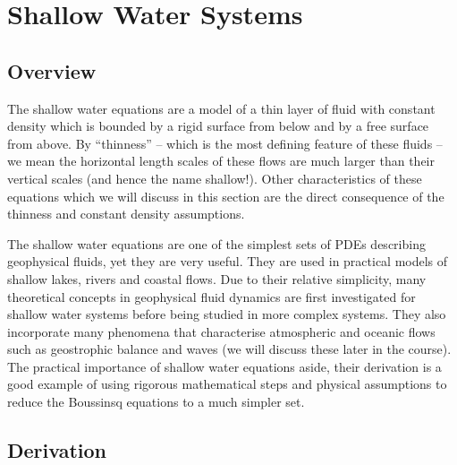 \documentclass[
  letterpaper,
  twocolumn,
  landscape]{report}
\begin{document}
\hypertarget{sec-chap:SW}{%
\chapter{Shallow Water Systems}\label{sec-chap:SW}}

\hypertarget{overview-1}{%
\section{Overview}\label{overview-1}}

The shallow water equations are a model of a thin layer of fluid with
constant density which is bounded by a rigid surface from below and by a
free surface from above. By ``thinness'' -- which is the most defining
feature of these fluids -- we mean the horizontal length scales of these
flows are much larger than their vertical scales (and hence the name
shallow!). Other characteristics of these equations which we will
discuss in this section are the direct consequence of the thinness and
constant density assumptions.

The shallow water equations are one of the simplest sets of PDEs
describing geophysical fluids, yet they are very useful. They are used
in practical models of shallow lakes, rivers and coastal flows. Due to
their relative simplicity, many theoretical concepts in geophysical
fluid dynamics are first investigated for shallow water systems before
being studied in more complex systems. They also incorporate many
phenomena that characterise atmospheric and oceanic flows such as
geostrophic balance and waves (we will discuss these later in the
course). The practical importance of shallow water equations aside,
their derivation is a good example of using rigorous mathematical steps
and physical assumptions to reduce the Boussinsq equations to a much
simpler set.

\hypertarget{derivation}{%
\section{Derivation}\label{derivation}}
\end{document}
